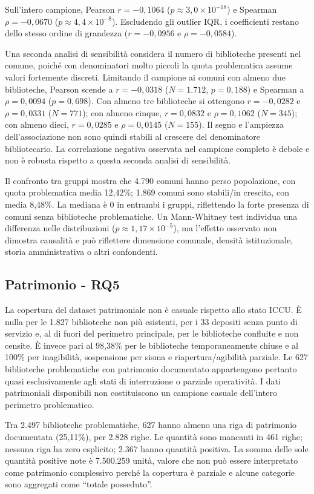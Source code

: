 \documentclass[11pt,a4paper]{article}
\begin{document}
Sull'intero campione, Pearson $r=-0{,}1064$ ($p\approx3{,}0\times10^{-18}$) e Spearman $\rho=-0{,}0670$ ($p\approx4{,}4\times10^{-8}$). Escludendo gli outlier IQR, i coefficienti restano dello stesso ordine di grandezza ($r=-0{,}0956$ e $\rho=-0{,}0584$).

Una seconda analisi di sensibilità considera il numero di biblioteche presenti nel comune, poiché con denominatori molto piccoli la quota problematica assume valori fortemente discreti. Limitando il campione ai comuni con almeno due biblioteche, Pearson scende a $r=-0{,}0318$ ($N=1.712$, $p=0{,}188$) e Spearman a $\rho=0{,}0094$ ($p=0{,}698$). Con almeno tre biblioteche si ottengono $r=-0{,}0282$ e $\rho=0{,}0331$ ($N=771$); con almeno cinque, $r=0{,}0832$ e $\rho=0{,}1062$ ($N=345$); con almeno dieci, $r=0{,}0285$ e $\rho=0{,}0145$ ($N=155$). Il segno e l'ampiezza dell'associazione non sono quindi stabili al crescere del denominatore bibliotecario. La correlazione negativa osservata nel campione completo è debole e non è robusta rispetto a questa seconda analisi di sensibilità.

Il confronto tra gruppi mostra che 4.790 comuni hanno perso popolazione, con quota problematica media 12,42\%; 1.869 comuni sono stabili/in crescita, con media 8,48\%. La mediana è 0 in entrambi i gruppi, riflettendo la forte presenza di comuni senza biblioteche problematiche. Un Mann-Whitney test individua una differenza nelle distribuzioni ($p\approx1{,}17\times10^{-5}$), ma l'effetto osservato non dimostra causalità e può riflettere dimensione comunale, densità istituzionale, storia amministrativa o altri confondenti.

\subsection{Patrimonio - RQ5}
La copertura del dataset patrimoniale non è casuale rispetto allo stato ICCU. È nulla per le 1.827 biblioteche non più esistenti, per i 33 depositi senza punto di servizio e, al di fuori del perimetro principale, per le biblioteche confluite e non censite. È invece pari al 98,38\% per le biblioteche temporaneamente chiuse e al 100\% per inagibilità, sospensione per sisma e riapertura/agibilità parziale. Le 627 biblioteche problematiche con patrimonio documentato appartengono pertanto quasi esclusivamente agli stati di interruzione o parziale operatività. I dati patrimoniali disponibili non costituiscono un campione casuale dell'intero perimetro problematico.

Tra 2.497 biblioteche problematiche, 627 hanno almeno una riga di patrimonio documentata (25,11\%), per 2.828 righe. Le quantità sono mancanti in 461 righe; nessuna riga ha zero esplicito; 2.367 hanno quantità positiva. La somma delle sole quantità positive note è 7.500.259 unità, valore che non può essere interpretato come patrimonio complessivo perché la copertura è parziale e alcune categorie sono aggregati come ``totale posseduto''.
\end{document}

